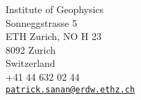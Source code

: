 {\small Institute of  Geophysics\\ Sonneggstrasse 5\\ ETH Zurich, NO H 23\\ 8092 Zurich\\ Switzerland}\\
{\small +41 44 632 02 44} \\
\vspace{5pt}
{\tt \href{mailto:patrick.sanan@gmail.com}{patrick.sanan@erdw.ethz.ch}}\\
